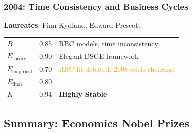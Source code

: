 \documentclass[11pt,a4paper]{article}
\begin{document}
\subsubsection{2004: Time Consistency and Business Cycles}
\textbf{Laureates}: Finn Kydland, Edward Prescott

\begin{center}
\begin{tabular}{lcl}
\toprule
$B$ & 0.85 & RBC models, time inconsistency \\
$E_{\text{theory}}$ & 0.90 & Elegant DSGE framework \\
$E_{\text{empirical}}$ & 0.70 & \textcolor{orange}{RBC fit debated, 2008 crisis challenge} \\
\midrule
$E_{\text{final}}$ & 0.80 & \\
$K$ & 0.94 & \textbf{Highly Stable} \\
\bottomrule
\end{tabular}
\end{center}

\subsection{Summary: Economics Nobel Prizes}
\end{document}
